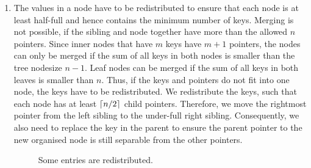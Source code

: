 \documentclass[abstracton,12pt,oneside]{scrreprt}
\DeclarePairedDelimiter\ceil{\lceil}{\rceil}
\begin{document}
\begin{enumerate}
	
	\item The values in a node have to be redistributed to ensure that each node is at least half-full and hence contains the minimum number of keys. Merging is not possible, if the sibling and node together have more than the allowed $n$ pointers. Since inner nodes that have $m$ keys have $m+1$ pointers, the nodes can only be merged if the sum of all keys in both nodes is smaller than the tree nodesize $n-1$. Leaf nodes can be merged if the sum of all keys in both leaves is smaller than $n$. Thus, if the keys and pointers do not fit into one node, the keys have to be redistributed. We redistribute the keys, such that each node has at least $\ceil{n/2}$ child pointers. Therefore, we move the rightmost pointer from the left sibling to the under-full right sibling. Consequently, we also need to replace the key in the parent to ensure the parent pointer to the new organised node is still separable from the other pointers.
		\begin{figure}[ht!]
			\centering
			\vspace{2mm}
			\caption{Some entries are redistributed.}
			\label{fig:enoughkeys}
		\end{figure} 
	
	
\end{enumerate} 
\end{document}
